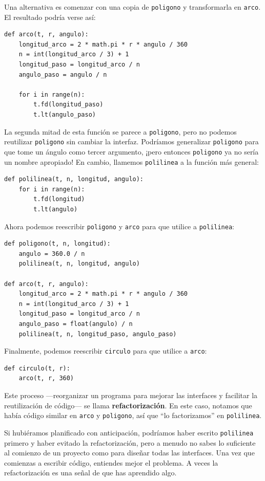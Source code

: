 \documentclass[10pt]{book}
\begin{document}
Una alternativa es comenzar con una copia
de {\tt poligono} y transformarla en {\tt arco}.  El resultado
podría verse así:

\begin{verbatim}
def arco(t, r, angulo):
    longitud_arco = 2 * math.pi * r * angulo / 360
    n = int(longitud_arco / 3) + 1
    longitud_paso = longitud_arco / n
    angulo_paso = angulo / n

    for i in range(n):
        t.fd(longitud_paso)
        t.lt(angulo_paso)
\end{verbatim}
%
La segunda mitad de esta función se parece a {\tt poligono}, pero
no podemos reutilizar {\tt poligono} sin cambiar la interfaz.  Podríamos
generalizar {\tt poligono} para que tome un ángulo como tercer argumento,
¡pero entonces {\tt poligono} ya no sería un nombre apropiado!
En cambio, llamemos {\tt polilinea} a la función más general: 

\begin{verbatim}
def polilinea(t, n, longitud, angulo):
    for i in range(n):
        t.fd(longitud)
        t.lt(angulo)
\end{verbatim}
%
Ahora podemos reescribir {\tt poligono} y {\tt arco} para que utilice a {\tt polilinea}:

\begin{verbatim}
def poligono(t, n, longitud):
    angulo = 360.0 / n
    polilinea(t, n, longitud, angulo)

def arco(t, r, angulo):
    longitud_arco = 2 * math.pi * r * angulo / 360
    n = int(longitud_arco / 3) + 1
    longitud_paso = longitud_arco / n
    angulo_paso = float(angulo) / n
    polilinea(t, n, longitud_paso, angulo_paso)
\end{verbatim}
%
Finalmente, podemos reescribir {\tt circulo} para que utilice a {\tt arco}:

\begin{verbatim}
def circulo(t, r):
    arco(t, r, 360)
\end{verbatim}
%
Este proceso ---reorganizar un programa para mejorar
las interfaces y facilitar la reutilización de código--- se llama {\bf refactorización}.
En este caso, notamos que había código similar en {\tt arco} y
{\tt poligono}, así que ``lo factorizamos'' en {\tt polilinea}.

Si hubiéramos planificado con anticipación, podríamos haber escrito {\tt polilinea} primero
y haber evitado la refactorización, pero a menudo no sabes lo suficiente al
comienzo de un proyecto como para diseñar todas las interfaces.  Una vez que comienzas
a escribir código, entiendes mejor el problema.  A veces la refactorización es una
señal de que has aprendido algo.
\end{document}
